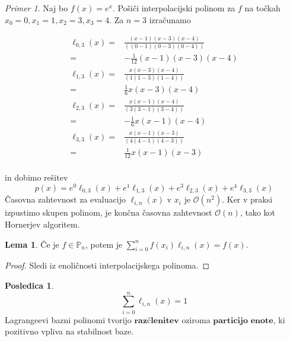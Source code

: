 \documentclass[a4paper,12pt]{article}
\theoremstyle{definition}
\newtheorem{lemma}[counter]{Lema}
\newtheorem{conseq}[counter]{Posledica}
\theoremstyle{remark}
\newtheorem*{ex}{Primer}
\newcommand{\Pp}{\mathbb{P}}
\begin{document}
\begin{ex}
    Naj bo $f(x) = e^x$. Pošiči interpolacijski polinom za $f$ na točkah $x_0 = 0, x_1 = 1, x_2 = 3, x_3 = 4$.
    Za $n = 3$ izračunamo

    \begin{align*}
        \ell_{0, 3}(x) =& \frac{(x-1)(x-3)(x-4)}{((0-1)(0-3)(0-4))} \\
                       =& -\frac{1}{12}(x-1)(x-3)(x-4) \\
        \ell_{1, 3}(x) =& \frac{x(x-3)(x-4)}{(1(1-3)(1-4))} \\
                       =& \frac{1}{6} x(x-3)(x-4) \\
        \ell_{2, 3}(x) =& \frac{x(x-1)(x-4)}{(3(3-1)(3-4))} \\
                       =& -\frac{1}{6} x(x-1)(x-4) \\
        \ell_{3, 3}(x) =& \frac{x(x-1)(x-3)}{(4(4-1)(4-3))} \\
                       =& \frac{1}{12} x(x-1)(x-3) \\
    \end{align*}

    in dobimo rešitev
    \begin{equation*}
        p(x) = e^0 \ell_{0, 3}(x) + e^1 \ell_{1, 3}(x) + e^3 \ell_{2, 3} (x) + e^4 \ell_{3, 3}(x)
    \end{equation*}
    Časovna zahtevnost za evaluacijo $\ell_{i, n}(x)$ v $x_i$ je $\mathcal{O}(n^2)$. Ker v praksi izpustimo skupen polinom,
    je končna časovna zahtevnost $\mathcal{O}(n)$, tako kot Hornerjev algoritem.
\end{ex}


\begin{lemma}
    Če je $f \in \Pp_n$, potem je $\sum_{i = 0}^{n} f(x_i) \ell_{i, n} (x) = f(x)$.
\end{lemma}
\begin{proof}
    Sledi iz enoličnosti interpolacijskega polinoma.
\end{proof}

\begin{conseq}
    \begin{equation}
        \sum_{i = 0}^{n} \ell_{i, n}(x) = 1
    \end{equation}
    Lagrangeevi bazni polinomi tvorijo $\textbf{razčlenitev}$ oziroma $\textbf{particijo enote}$, ki pozitivno vpliva na stabilnost baze.
\end{conseq}
\end{document}
